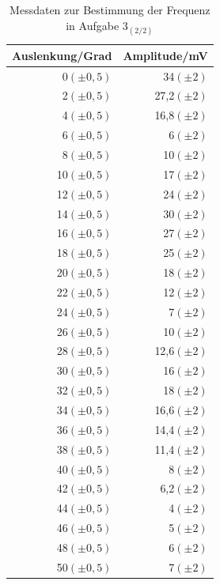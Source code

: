 \documentclass[12pt]{scrartcl}
\begin{document}
\begin{table}[H]
\caption{Messdaten zur Bestimmung der Frequenz in Aufgabe 3$_{(2/2)}$}
\begin{center}
\begin{tabular}{|r|r|}
\hline
Auslenkung/Grad & Amplitude/mV \\ \hline
0$(\pm 0,5)$ & 34$(\pm 2)$ \\ \hline
2$(\pm 0,5)$ & 27,2$(\pm 2)$ \\ \hline
4$(\pm 0,5)$ & 16,8$(\pm 2)$ \\ \hline
6$(\pm 0,5)$ & 6$(\pm 2)$ \\ \hline
8$(\pm 0,5)$ & 10$(\pm 2)$ \\ \hline
10$(\pm 0,5)$ & 17$(\pm 2)$ \\ \hline
12$(\pm 0,5)$ & 24$(\pm 2)$ \\ \hline
14$(\pm 0,5)$ & 30$(\pm 2)$ \\ \hline
16$(\pm 0,5)$ & 27$(\pm 2)$ \\ \hline
18$(\pm 0,5)$ & 25$(\pm 2)$ \\ \hline
20$(\pm 0,5)$ & 18$(\pm 2)$ \\ \hline
22$(\pm 0,5)$ & 12$(\pm 2)$ \\ \hline
24$(\pm 0,5)$ & 7$(\pm 2)$ \\ \hline
26$(\pm 0,5)$ & 10$(\pm 2)$ \\ \hline
28$(\pm 0,5)$ & 12,6$(\pm 2)$ \\ \hline
30$(\pm 0,5)$ & 16$(\pm 2)$ \\ \hline
32$(\pm 0,5)$ & 18$(\pm 2)$ \\ \hline
34$(\pm 0,5)$ & 16,6$(\pm 2)$ \\ \hline
36$(\pm 0,5)$ & 14,4$(\pm 2)$ \\ \hline
38$(\pm 0,5)$ & 11,4$(\pm 2)$ \\ \hline
40$(\pm 0,5)$ & 8$(\pm 2)$ \\ \hline
42$(\pm 0,5)$ & 6,2$(\pm 2)$ \\ \hline
44$(\pm 0,5)$ & 4$(\pm 2)$ \\ \hline
46$(\pm 0,5)$ & 5$(\pm 2)$ \\ \hline
48$(\pm 0,5)$ & 6$(\pm 2)$ \\ \hline
50$(\pm 0,5)$ & 7$(\pm 2)$ \\ \hline
\end{tabular}
\end{center}
\label{tab:aufgabe3_2}
\end{table}
\end{document}
